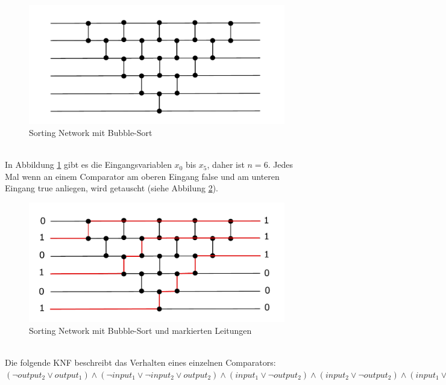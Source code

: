 \documentclass[a4,abstract=on]{scrartcl}
\begin{document}
\begin{figure}[H]
\centering
\includegraphics[width=\textwidth]{sorting_network_bubble.pdf}
\caption{Sorting Network mit Bubble-Sort}
\label{fig:sorting_network_naiv_bsp}
\end{figure}
\ \\
In Abbildung \ref{fig:sorting_network_naiv_bsp} gibt es die Eingangsvariablen $x_0$ bis $x_5$, daher ist $n=6$. Jedes Mal wenn an einem Comparator am oberen Eingang false und am unteren Eingang true anliegen, wird getauscht (siehe Abbilung \ref{fig:sorting_network_naiv_bsp1}).

\begin{figure}[H]
\centering
\includegraphics[width=\textwidth]{sorting_network_bubble_rot.pdf}
\caption{Sorting Network mit Bubble-Sort und markierten Leitungen}
\label{fig:sorting_network_naiv_bsp1}
\end{figure}
\ \\
Die folgende KNF beschreibt das Verhalten eines einzelnen Comparators:\\
$(\neg output_2 \vee output_1) \wedge (\neg input_1 \vee \neg input_2 \vee output_2) \wedge (input_1 \vee \neg output_2) \wedge (input_2 \vee \neg output_2) \wedge (input_1 \vee input_2 \vee \neg output_1) \wedge (\neg input_1 \vee output_1) \wedge (\neg input_2 \vee output_1)$
\end{document}
